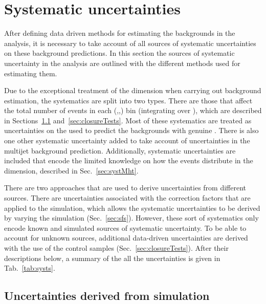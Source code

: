 

\section{Systematic uncertainties} %
\label{sec:systematics}

After defining data driven methods for estimating the \SM backgrounds
in the analysis, it is necessary to take account of all sources of
systematic uncertainties on these background predictions. In this
section the sources of systematic uncertainty in the analysis are
outlined with the different methods used for estimating them.  

Due to the exceptional treatment of the \MHT dimension when carrying
out background estimation, the systematics are split into two types.
There are those that affect the total number of events in each
(\HT,\nj,\nb) bin (integrating over \MHT), which are described in
Sections~\ref{sec:simUnc} and~\ref{sec:closureTests}. Most of these
systematics are treated as uncertainties on the \TFs used to predict
the \SM backgrounds with genuine \MET. There is also one other
systematic uncertainty added to take account of uncertainties in the \QCD
multijet background prediction. Additionally, systematic uncertainties
are included that encode the limited knowledge on how the events
distribute in the \mht dimension, described in Sec.~\ref{sec:systMht}.

There are two approaches that are used to derive uncertainties
from different sources. There are uncertainties associated with the
correction factors that are applied to the simulation, which allows
the systematic uncertainties to be derived by varying the simulation (Sec.~\ref{sec:sfs}).
However, these sort of systematics only encode known and simulated
sources of systematic uncertainty. To be able to account for unknown
sources, additional data-driven uncertainties are derived  with the
use of the control samples (Sec.~\ref{sec:closureTests}). After their
descriptions below, a summary of the all the uncertainties is given in
Tab.~\ref{tab:systs}.

\subsection{Uncertainties derived from simulation}
\label{sec:simUnc}

